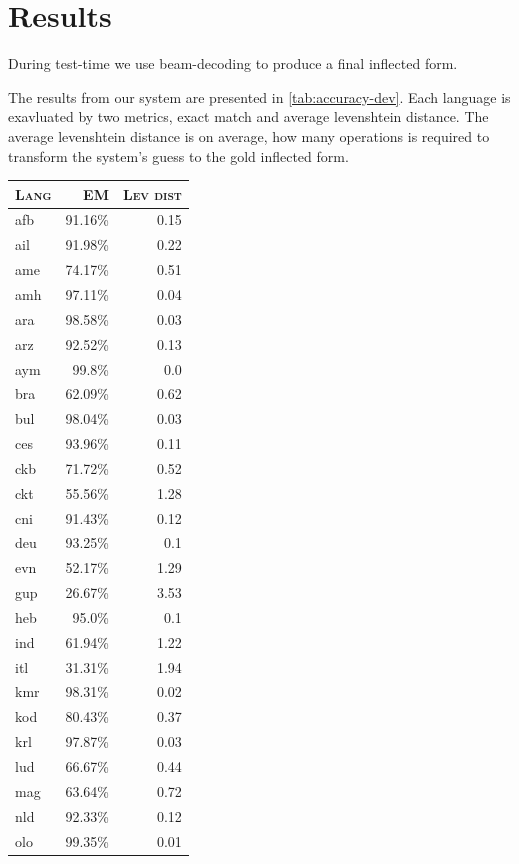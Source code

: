\documentclass[11pt,a4paper]{article}
\begin{document}
\section{Results}

During test-time we use beam-decoding to produce a final inflected
form.

The results from our system are presented in
\cref{tab:accuracy-dev}. Each language is exavluated by two metrics,
exact match and average levenshtein distance. The average levenshtein
distance is on average, how many operations is required to transform
the system's guess to the gold inflected form.

\begin{table}[ht!]	
\centering
\begin{tabular}{lrr}
\textsc{Lang} & \textsc{EM} & \textsc{Lev dist}  \\
  \hline
  afb & 91.16\% & 0.15 \\
  ail & 91.98\% & 0.22 \\
  ame & 74.17\% & 0.51 \\
  amh & 97.11\% & 0.04 \\
  ara & 98.58\% & 0.03 \\
  arz & 92.52\% & 0.13 \\
  aym & 99.8\% & 0.0 \\
  bra & 62.09\% & 0.62 \\
  bul & 98.04\% & 0.03 \\
  ces & 93.96\% & 0.11 \\
  ckb & 71.72\% & 0.52 \\
  ckt & 55.56\% & 1.28 \\
  cni & 91.43\% & 0.12 \\
  deu & 93.25\% & 0.1 \\
  evn & 52.17\% & 1.29 \\
  gup & 26.67\% & 3.53 \\
  heb & 95.0\% & 0.1 \\
  ind & 61.94\% & 1.22 \\
  itl & 31.31\% & 1.94 \\
  kmr & 98.31\% & 0.02 \\
  kod & 80.43\% & 0.37 \\
  krl & 97.87\% & 0.03 \\
  lud & 66.67\% & 0.44 \\
  mag & 63.64\% & 0.72 \\
  nld & 92.33\% & 0.12 \\
  olo & 99.35\% & 0.01 \\

\end{tabular}
\end{table}
\end{document}
